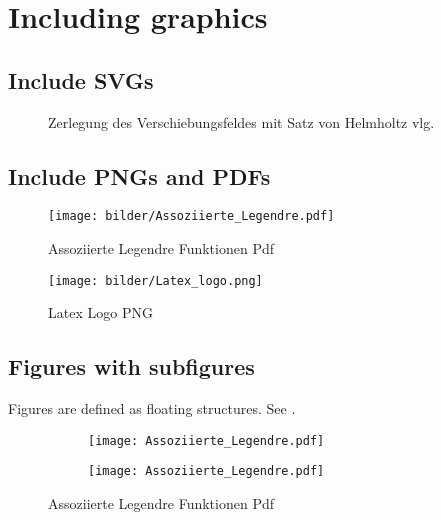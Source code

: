 \section{Including graphics}
\label{sec:figs}

\subsection{Include SVGs}
\begin{figure}[H]
	\begin{center}
		
	\end{center}
	\caption{Zerlegung des Verschiebungsfeldes mit Satz von Helmholtz vlg. \citep{Mueller1989}}
	\label{abb:Satz_von_Helmholtz}
\end{figure}

\subsection{Include PNGs and PDFs}

\begin{figure}[h]
	\centering
		\texttt{[image: bilder/Assoziierte\_Legendre.pdf]}
	\caption{Assoziierte Legendre Funktionen Pdf}
	\label{fig:Assoziierte_Legendre}
\end{figure}

\begin{figure}[H]
	\centering
		\texttt{[image: bilder/Latex\_logo.png]}
	\label{fig:Latex_Logo}
	\caption{Latex Logo PNG}
\end{figure}

\subsection{Figures with subfigures}
Figures are defined as floating structures. See \citep[][page 91]{Sturm2010}.


\begin{figure}[H]
\centering%
\begin{subfigure}[c]{0.49\textwidth}
                \texttt{[image: Assoziierte\_Legendre.pdf]} \label{abb:315_re}
\end{subfigure}
\begin{subfigure}[c]{0.49\textwidth}
\texttt{[image: Assoziierte\_Legendre.pdf]} \label{pic:497_re}
\end{subfigure}
                \caption{Assoziierte Legendre Funktionen Pdf}
                \label{abb:bild1-2}
\end{figure}


